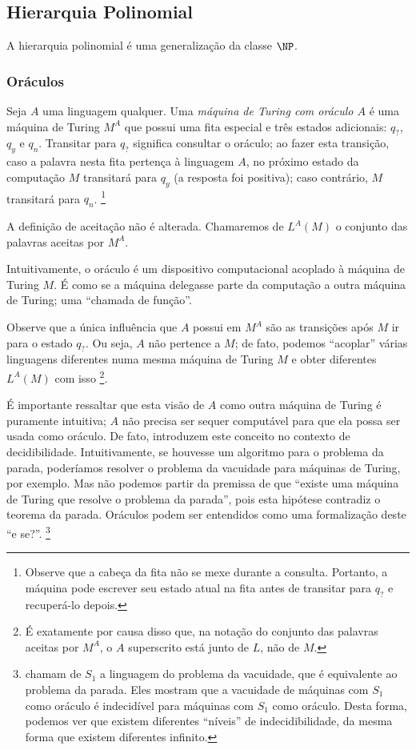 \subsection{Hierarquia Polinomial}

A hierarquia polinomial é uma generalização da classe $\NP$.

\subsubsection{Oráculos}

\begin{definition}
    Seja $A$ uma linguagem qualquer.
    Uma \emph{máquina de Turing com oráculo $A$}
    é uma máquina de Turing $M^A$ que possui uma fita especial
    e três estados adicionais: $q_?$, $q_y$ e $q_n$.
    Transitar para $q_?$ significa consultar o oráculo;
    ao fazer esta transição,
    caso a palavra nesta fita pertença à linguagem $A$,
    no próximo estado da computação $M$ transitará para $q_y$
    (a resposta foi positiva);
    caso contrário, $M$ transitará para $q_n$.
    \footnote{
        Observe que a cabeça da fita não se mexe durante a consulta.
        Portanto, a máquina pode escrever seu estado atual na fita
        antes de transitar para $q_?$ e recuperá-lo depois.
    }

    A definição de aceitação não é alterada.
    Chamaremos de $L^A(M)$ o conjunto das palavras aceitas por $M^A$.
\end{definition}

Intuitivamente, o oráculo é um dispositivo computacional
acoplado à máquina de Turing $M$.
É como se a máquina delegasse parte da computação
a outra máquina de Turing;
uma ``chamada de função''.

Observe que a única influência que $A$ possui em $M^A$
são as transições após $M$ ir para o estado $q_?$.
Ou seja, $A$ não pertence a $M$;
de fato, podemos ``acoplar'' várias linguagens diferentes
numa mesma máquina de Turing $M$
e obter diferentes $L^A(M)$ com isso%
\footnote{
    É exatamente por causa disso que,
    na notação do conjunto das palavras aceitas por $M^A$,
    o $A$ superscrito está junto de $L$, não de $M$.
}.

É importante ressaltar que esta visão de $A$ como outra máquina de Turing
é puramente intuitiva;
$A$ não precisa ser sequer computável
para que ela possa ser usada como oráculo.
De fato, 
introduzem este conceito no contexto de decidibilidade.
Intuitivamente, se houvesse um algoritmo para o problema da parada,
poderíamos resolver o problema da vacuidade para máquinas de Turing,
por exemplo.
Mas não podemos partir da premissa de que
``existe uma máquina de Turing que resolve o problema da parada'',
pois esta hipótese contradiz o teorema da parada.
Oráculos podem ser entendidos como uma formalização deste ``e se?''.
\footnote{
     chamam de $S_1$ a linguagem
    do problema da vacuidade,
    que é equivalente ao problema da parada.
    Eles mostram que a vacuidade de máquinas com $S_1$ como oráculo
    é indecidível para máquinas com $S_1$ como oráculo.
    Desta forma, podemos ver que existem diferentes ``níveis''
    de indecidibilidade,
    da mesma forma que existem diferentes infinito.
}
